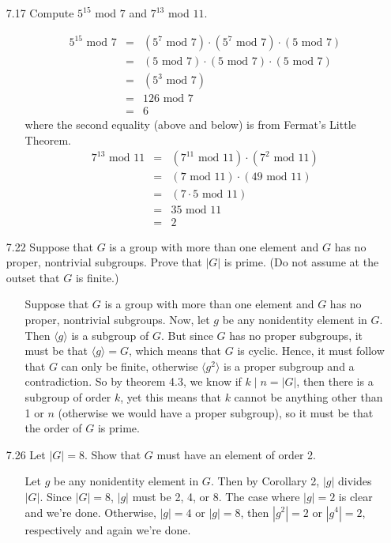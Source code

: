 \documentclass[12pt]{article}
\begin{document}
\begin{enumerate}
\item[7.17] Compute $5^{15}$ mod $7$ and $7^{13}$ mod $11$.
\begin{enumerate}
\item[]
\begin{eqnarray*}
5^{15} \mbox{ mod } 7 &=& (5^7 \mbox{ mod } 7) \cdot (5^7 \mbox{ mod } 7) \cdot (5 \mbox{ mod } 7) \\
&=& (5 \mbox{ mod } 7) \cdot (5 \mbox{ mod } 7) \cdot (5 \mbox{ mod } 7) \\
&=& (5^3 \mbox{ mod } 7) \\
&=& 126 \mbox{ mod } 7 \\
&=& 6
\end{eqnarray*}
where the second equality (above and below) is from Fermat's Little Theorem.
\begin{eqnarray*}
7^{13} \mbox{ mod } 11 &=& (7^{11} \mbox{ mod } 11) \cdot (7^2 \mbox{ mod } 11) \\
&=& (7 \mbox{ mod } 11) \cdot (49 \mbox{ mod } 11) \\
&=& (7 \cdot 5 \mbox{ mod } 11) \\
&=& 35 \mbox{ mod } 11 \\
&=& 2
\end{eqnarray*}
\end{enumerate}

\item[7.22] Suppose that $G$ is a group with more than one element and $G$ has no
proper, nontrivial subgroups. Prove that $|G|$ is prime. (Do not assume at the outset that
$G$ is finite.)
\begin{enumerate}
\item[] Suppose that $G$ is a group with more than one element and $G$ has no proper, nontrivial subgroups.
Now, let $g$ be any nonidentity element in $G$. Then $\langle g\rangle$ is a subgroup of 
$G$. But since $G$ has no proper subgroups, it must be that $\langle g\rangle = G$, which means
that $G$ is cyclic. Hence, it must follow that $G$ can only be finite, 
otherwise $\langle g^2\rangle$ is a proper subgroup and a contradiction. So by theorem 4.3, 
we know if $k \mid n = |G|$, then there is a subgroup of order $k$, yet this means that $k$ cannot 
be anything other than 1 or $n$ (otherwise we would have a proper subgroup), 
so it must be that the order of $G$ is prime.
\end{enumerate}

\item[7.26] Let $|G| = 8$. Show that $G$ must have an element of order 2.
\begin{enumerate}
\item[] Let $g$ be any nonidentity element in $G$. Then by Corollary 2, $|g|$ divides $|G|$.
Since $|G| = 8$, $|g|$ must be 2, 4, or 8. The case where $|g| = 2$ is clear and we're done.
Otherwise, $|g| = 4$ or $|g| = 8$, then $|g^2| = 2$ or $|g^4| = 2$, respectively and again
we're done.
\end{enumerate}


\end{enumerate}
\end{document}
